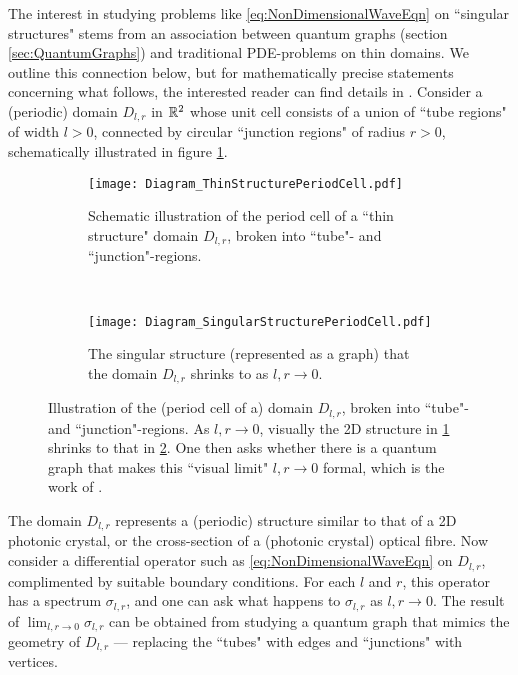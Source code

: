 The interest in studying problems like \eqref{eq:NonDimensionalWaveEqn} on ``singular structures" stems from an association between quantum graphs (section \ref{sec:QuantumGraphs}) and traditional PDE-problems on thin domains.
We outline this connection below, but for mathematically precise statements concerning what follows, the interested reader can find details in \cite{exner2005convergence, kuchment2001convergence}.
Consider a (periodic) domain $D_{l,r}$ in $\mathbb{R}^2$ whose unit cell consists of a union of ``tube regions" of width $l>0$, connected by circular ``junction regions" of radius $r>0$, schematically illustrated in figure \ref{fig:Diagram_ThinStructurePeriodCell}.
\begin{figure}[b!]
	\begin{subfigure}[t]{0.45\textwidth}
		\centering
		\texttt{[image: Diagram\_ThinStructurePeriodCell.pdf]}
		\caption{\label{fig:Diagram_ThinStructurePeriodCell} Schematic illustration of the period cell of a ``thin structure" domain $D_{l,r}$, broken into ``tube"- and ``junction"-regions.}
	\end{subfigure}
	~
	\begin{subfigure}[t]{0.45\textwidth}
		\centering
		\texttt{[image: Diagram\_SingularStructurePeriodCell.pdf]}
		\caption{\label{fig:Diagram_SingularStructurePeriodCell} The singular structure (represented as a graph) that the domain $D_{l,r}$ shrinks to as $l,r\rightarrow0$.}
	\end{subfigure}
	\caption{\label{fig:Diagram_ThinToSingular} Illustration of the (period cell of a) domain $D_{l,r}$, broken into ``tube"- and ``junction"-regions. As $l,r\rightarrow0$, visually the 2D structure in \ref{fig:Diagram_ThinStructurePeriodCell} shrinks to that in \ref{fig:Diagram_SingularStructurePeriodCell}. One then asks whether there is a quantum graph that makes this ``visual limit" $l,r\rightarrow0$ formal, which is the work of \cite{exner2005convergence, kuchment2001convergence}.}
\end{figure}
The domain $D_{l,r}$ represents a (periodic) structure similar to that of a 2D photonic crystal, or the cross-section of a (photonic crystal) optical fibre.
Now consider a differential operator such as \eqref{eq:NonDimensionalWaveEqn}  on $D_{l,r}$, complimented by suitable boundary conditions.
For each $l$ and $r$, this operator has a spectrum $\sigma_{l,r}$, and one can ask what happens to $\sigma_{l,r}$ as $l,r\rightarrow0$.
The result of $\lim_{l,r\rightarrow0}\sigma_{l,r}$ can be obtained from studying a quantum graph that mimics the geometry of $D_{l,r}$ --- replacing the ``tubes" with edges and ``junctions" with vertices.
